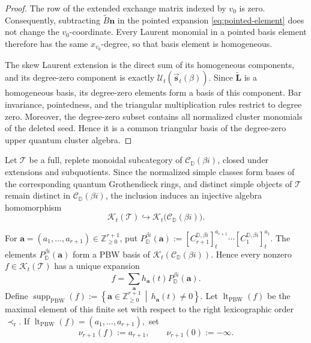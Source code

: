 \documentclass[12pt, reqno]{amsart}
\theoremstyle{plain}
\theoremstyle{definition}
\numberwithin{equation}{section}
\newcommand{\ZZ}{\mathbb{Z}}
\newcommand{\DD}{\mathbb{D}}
\begin{document}
\begin{proof}
The row of the extended exchange matrix indexed by \(v_0\) is zero.
Consequently, subtracting \(\widetilde B\mathbf n\) in the pointed
expansion \eqref{eq:pointed-element} does not change the
\(v_0\)-coordinate. Every Laurent monomial in a pointed basis element
therefore has the same \(x_{v_0}\)-degree, so that basis element is
homogeneous.

The skew Laurent extension is the direct sum of its homogeneous components,
and its degree-zero component is exactly
\(\mathcal U_t(\overrightarrow{\mathbf s}_t(\beta))\). Since
\(\widetilde{\mathbf L}\) is a homogeneous basis, its degree-zero elements
form a basis of this component. Bar invariance, pointedness, and the
triangular multiplication rules restrict to degree zero. Moreover, the
degree-zero subset contains all normalized cluster monomials of the deleted
seed. Hence it is a common triangular basis of the degree-zero upper quantum
cluster algebra.
\end{proof}


Let \(\mathscr T\) be a full, replete monoidal subcategory of
\(\mathscr C_{\DD}(\beta i)\), closed under extensions and
subquotients. Since the normalized simple classes form bases of the
corresponding quantum Grothendieck rings, and distinct simple objects
of \(\mathscr T\) remain distinct in
\(\mathscr C_{\DD}(\beta i)\), the inclusion induces an injective
algebra homomorphism
\[
    \mathcal K_t(\mathscr T)
    \hookrightarrow
    \mathcal K_t\bigl(\mathscr C_{\DD}(\beta i)\bigr).
\]

For
\(\mathbf a=(a_1,\ldots,a_{r+1})\in\ZZ_{\geq0}^{r+1}\), put
\(
    P_{\DD}^{\beta i}(\mathbf a)
    :=
    [C_{r+1}^{\DD,\beta i}]_t^{a_{r+1}}
    \cdots
    [C_1^{\DD,\beta i}]_t^{a_1}.
\)
The elements \(P_{\DD}^{\beta i}(\mathbf a)\) form a PBW basis of
\(\mathcal K_t(\mathscr C_{\DD}(\beta i))\). Hence every nonzero
\(f\in\mathcal K_t(\mathscr T)\) has a unique expansion
\[
    f
    =
    \sum_{\mathbf a}
        h_{\mathbf a}(t)P_{\DD}^{\beta i}(\mathbf a).
\]
Define
\(
    \operatorname{supp}_{\mathrm{PBW}}(f)
    :=
    \left\{
        \mathbf a\in\ZZ_{\geq0}^{r+1}
        \,\middle|\,
        h_{\mathbf a}(t)\neq0
    \right\}.
\)
Let \(\operatorname{lt}_{\mathrm{PBW}}(f)\) be the maximal element of
this finite set with respect to the right lexicographic order
\(\prec_{\mathrm r}\). If
\(
    \operatorname{lt}_{\mathrm{PBW}}(f)
    =
    (a_1,\ldots,a_{r+1}),
\)
set
\[
    \nu_{r+1}(f):=a_{r+1},
    \qquad
    \nu_{r+1}(0):=-\infty.
\]
\end{document}
